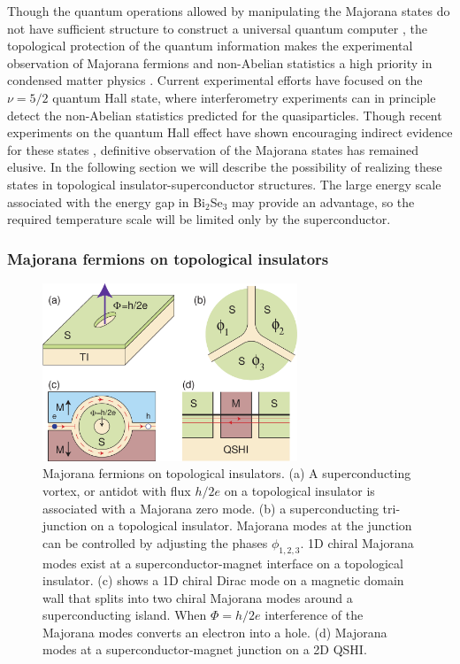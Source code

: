 \documentclass[twocolumn,floatfix,showpacs,rmp,aps]{revtex4}
\begin{document}
Though the quantum operations allowed by manipulating the Majorana states
do not have sufficient structure to construct a universal quantum
computer \cite{freedman02}, the topological protection of the quantum information
makes the experimental observation of Majorana fermions and non-Abelian
statistics a high priority in condensed matter
physics \cite{nayak08}.   Current experimental efforts have focused on the
$\nu=5/2$ quantum Hall state, where interferometry experiments \cite{sternhalperin06,dassarma05}  can
in principle detect the non-Abelian statistics predicted for the quasiparticles.
Though recent experiments on the quantum Hall effect
have shown encouraging indirect evidence for these states \cite{dolev08,radu08,willett09},
definitive observation of the Majorana states has remained elusive.
In the following section we will describe the possibility of
realizing these states in topological insulator-superconductor
structures.   The large energy scale associated with the energy gap
in Bi$_2$Se$_3$ may provide an advantage, so the required temperature
scale will be limited only by the superconductor.

\subsubsection{Majorana fermions on topological insulators}
\label{sec:majoranaontopo}

\begin{figure}
\includegraphics[width=3in]{Fig20}
\caption{Majorana fermions on topological insulators.  (a) A superconducting vortex, or antidot
with flux $h/2e$ on a topological insulator is associated with a Majorana zero mode.  (b)
a superconducting tri-junction on a topological insulator.  Majorana modes
at the junction can be controlled by adjusting the phases $\phi_{1,2,3}$.  1D chiral
Majorana modes exist at a superconductor-magnet interface on a topological
insulator. (c)
shows a 1D chiral Dirac mode on a magnetic domain wall
that splits into two chiral Majorana modes around a superconducting island.
When $\Phi = h/2e$ interference of the Majorana modes converts an electron
into a hole.  (d) Majorana modes at a superconductor-magnet junction on a 2D QSHI.
}
\label{fig:majorana}
\end{figure}
\end{document}
